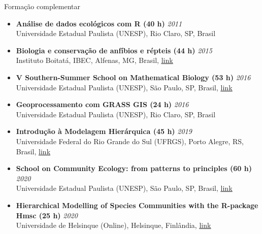 \documentclass{resume}
\begin{document}

\begin{rSection}{Formação complementar}

\begin{itemize} 

\item {\bf Análise de dados ecológicos com R (40 h)} \hfill {\em 2011}\\
Universidade Estadual Paulista (UNESP), Rio Claro, SP, Brasil

\item {\bf Biologia e conservação de anfíbios e répteis (44 h)} \hfill {\em 2015}\\
Instituto Boitatá, IBEC, Alfenas, MG, Brasil, \href{https://www.institutoboitata.org/}{\underline{link}}

\item {\bf V Southern-Summer School on Mathematical Biology (53 h)} \hfill {\em 2016}\\
Universidade Estadual Paulista (UNESP), São Paulo, SP, Brasil, \href{https://www.ictp-saifr.org/v-southern-summer-school-on-mathematical-biology}{\underline{link}} 

\item {\bf Geoprocessamento com GRASS GIS (24 h)} \hfill {\em 2016}\\
Universidade Estadual Paulista (UNESP), Rio Claro, SP, Brasil

\item {\bf Introdução à Modelagem Hierárquica (45 h)} \hfill {\em 2019}\\
Universidade Federal do Rio Grande do Sul (UFRGS), Porto Alegre, RS, Brasil, \href{http://ferrazlab.org/graduate}{\underline{link}}

\item {\bf School on Community Ecology: from patterns to principles (60 h)} \hfill {\em 2020}\\
Universidade Estadual Paulista (UNESP), São Paulo, SP, Brasil, \href{https://www.ictp-saifr.org/community-ecology-from-patterns-to-principles}{\underline{link}}

\item {\bf Hierarchical Modelling of Species Communities with the R-package Hmsc (25 h)} \hfill {\em 2020}\\
Universidade de Helsinque (Online), Helsinque, Finlândia, \href{https://www.helsinki.fi/en/researchgroups/statistical-ecology/hmsc}{\underline{link}}


\end{itemize}
\end{rSection}
\end{document}
